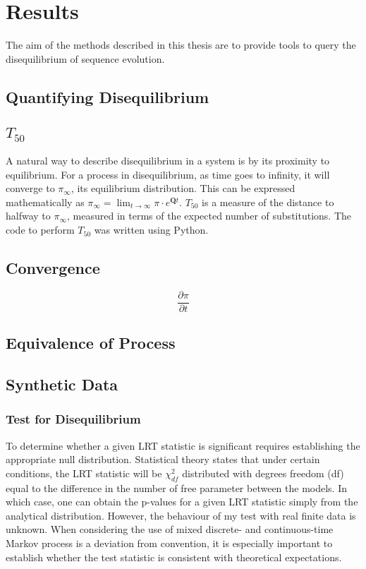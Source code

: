 \chapter{Results}

The aim of the methods described in this thesis are to provide tools to query the disequilibrium of sequence evolution. 


\section{Quantifying Disequilibrium}


\section{$T_{50}$}
A natural way to describe disequilibrium in a system is by its proximity to equilibrium. For a process in disequilibrium, as time goes to infinity, it will converge to $\pi_\infty$, its equilibrium distribution. This can be expressed mathematically as $\pi_\infty = \lim_{t \to \infty}\pi \cdot e^{\mathbf{Q}t}.$ ${T_{50}}$ is a measure of the distance to halfway to $\pi_\infty$, measured in terms of the expected number of substitutions. The code to perform $T_{50}$ was written using Python.


\section{Convergence}

$$\frac{\partial \pi}{\partial t}$$

\section{Equivalence of Process}


\section{Synthetic Data}

\subsection{Test for Disequilibrium}

 

To determine whether a given LRT statistic is significant requires establishing the appropriate null distribution. Statistical theory states that under certain conditions, the LRT statistic will be $\chi^2_{df}$ distributed with degrees freedom (df) equal to the difference in the number of free parameter between the models. In which case, one can obtain the p-values for a given LRT statistic simply from the analytical distribution. However, the behaviour of my test with real finite data is unknown. When considering the use of mixed discrete- and continuous-time Markov process is a deviation from convention, it is especially important to establish whether the test statistic is consistent with theoretical expectations. 

